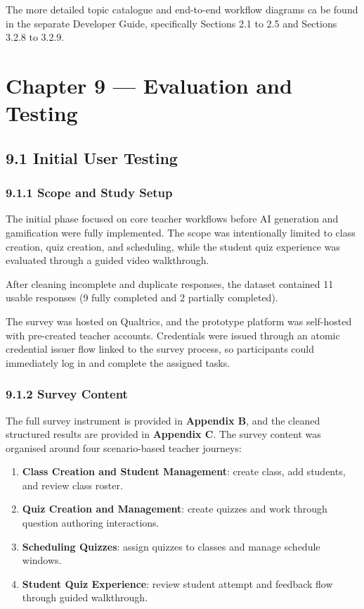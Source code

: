 \documentclass[
  12pt,
  a4paper,
]{report}
\begin{document}
The more detailed topic catalogue and end-to-end workflow diagrams ca be found
in the separate Developer Guide, specifically Sections 2.1 to
2.5 and Sections 3.2.8 to 3.2.9.

\hypertarget{chapter-10-evaluation-and-testing}{%
\chapter{Chapter 9 --- Evaluation and
Testing}\label{chapter-9-evaluation-and-testing}}

\hypertarget{initial-user-testing}{%
\section{9.1 Initial User Testing}\label{initial-user-testing}}

\hypertarget{study-purpose-and-evaluation-scope}{%
\subsection{9.1.1 Scope and Study
Setup}\label{study-purpose-and-evaluation-scope}}

The initial phase focused on core teacher workflows before AI generation
and gamification were fully implemented. The scope was intentionally
limited to class creation, quiz creation, and scheduling, while the
student quiz experience was evaluated through a guided video walkthrough.

After cleaning incomplete and duplicate responses, the dataset contained
11 usable responses (9 fully completed and 2 partially completed).

The survey was hosted on Qualtrics, and the prototype platform was
self-hosted with pre-created teacher accounts. Credentials were issued
through an atomic credential issuer flow linked to the survey process,
so participants could immediately log in and complete the assigned
tasks.

\hypertarget{survey-content-initial-phase}{%
\subsection{9.1.2 Survey Content}\label{survey-content-initial-phase}}

The full survey instrument is provided in \textbf{Appendix B}, and the
cleaned structured results are provided in \textbf{Appendix C}. The
survey content was organised around four scenario-based teacher journeys:

\begin{enumerate}
\def\labelenumi{\arabic{enumi}.}
\item
  \textbf{Class Creation and Student Management}: create class, add
  students, and review class roster.
\item
  \textbf{Quiz Creation and Management}: create quizzes and work through
  question authoring interactions.
\item
  \textbf{Scheduling Quizzes}: assign quizzes to classes and manage
  schedule windows.
\item
  \textbf{Student Quiz Experience}: review student attempt and feedback
  flow through guided walkthrough.
\end{enumerate}
\end{document}
